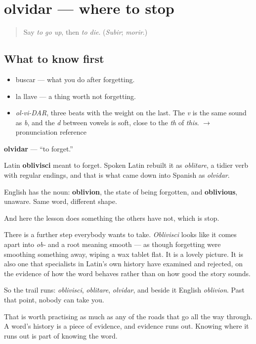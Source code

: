 \section[olvidar]{olvidar — where to stop}

\label{lesson:ES-C384-olvidar}



\begin{quote}
Say \emph{to go up}, then \emph{to die}. (\emph{Subir}; \emph{morir}.)
\end{quote}

\subsection*{What to know first}
\begin{itemize}
\raggedright
  \item buscar — what you do after forgetting.
  \item la llave — a thing worth not forgetting.
\end{itemize}

\begin{sounds}
\begin{itemize}
\raggedright
  \item \emph{ol-vi-DAR}, three beats with the weight on the last. The \emph{v} is the same sound as \emph{b}, and the \emph{d} between vowels is soft, close to the \emph{th} of \emph{this}. $\to$ pronunciation reference
\end{itemize}
\end{sounds}

\begin{cousinweb}
\textbf{olvidar} — \textquotedblleft{}to forget.\textquotedblright{}

Latin \textbf{oblivisci} meant to forget. Spoken Latin rebuilt it as \emph{oblitare}, a tidier verb with regular endings, and that is what came down into Spanish as \emph{olvidar}.

English has the noun: \textbf{oblivion}, the state of being forgotten, and \textbf{oblivious}, unaware. Same word, different shape.

And here the lesson does something the others have not, which is stop.

There is a further step everybody wants to take. \emph{Oblivisci} looks like it comes apart into \emph{ob-} and a root meaning smooth — as though forgetting were smoothing something away, wiping a wax tablet flat. It is a lovely picture. It is also one that specialists in Latin's own history have examined and rejected, on the evidence of how the word behaves rather than on how good the story sounds.

So the trail runs: \emph{oblivisci}, \emph{oblitare}, \emph{olvidar}, and beside it English \emph{oblivion}. Past that point, nobody can take you.

That is worth practising as much as any of the roads that go all the way through. A word's history is a piece of evidence, and evidence runs out. Knowing where it runs out is part of knowing the word.
\end{cousinweb}

